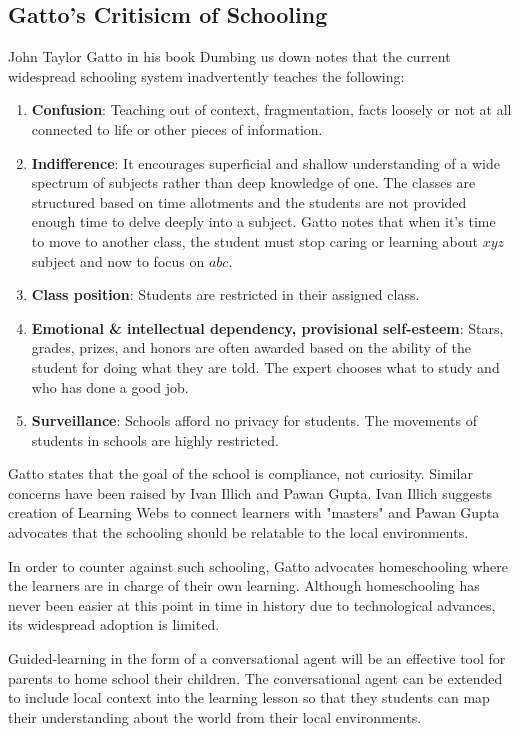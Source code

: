 \documentclass[]{article}
\begin{document}
 \subsection[Gatto's Critisicm]{Gatto's Critisicm of Schooling}
 John Taylor Gatto in his book Dumbing us down \cite{gatto2017dumbing} notes that the current widespread schooling system inadvertently teaches the following:
 \begin{enumerate}
  \item \textbf{Confusion}: Teaching out of context, fragmentation, facts loosely or not at all connected to life or other pieces of information.
  \item \textbf{Indifference}: It encourages superficial and shallow understanding of a wide spectrum of subjects rather than deep knowledge of one. The classes are structured based on time allotments and the students are not provided enough time to delve deeply into a subject. Gatto notes that when it's time to move to another class, the student must stop caring or learning about $xyz$ subject and now to focus on $abc$.
  \item \textbf{Class position}: Students are restricted in their assigned class. 
  \item \textbf{Emotional \& intellectual dependency, provisional self-esteem}: Stars, grades, prizes, and honors are often awarded based on the ability of the student for doing what they are told. The expert chooses what to study and who has done a good job.
  \item \textbf{Surveillance}: Schools afford no privacy for students. The movements of students in schools are highly restricted.
\end{enumerate}

Gatto states that the goal of the school is compliance, not curiosity. Similar concerns have been raised by Ivan Illich \cite{illich1973deschooling} and Pawan Gupta\cite{gupta2000liberating}. Ivan Illich suggests creation of Learning Webs to connect learners with "masters" and Pawan Gupta advocates that the schooling should be relatable to the local environments.

In order to counter against such schooling, Gatto advocates homeschooling where the learners are in charge of their own learning. Although homeschooling has never been easier at this point in time in history due to technological advances, its widespread adoption is limited. 

Guided-learning in the form of a conversational agent will be an effective tool for parents to home school their children. The conversational agent can be extended to include local context into the learning lesson so that they students can map their understanding about the world from their local environments. 
\end{document}
